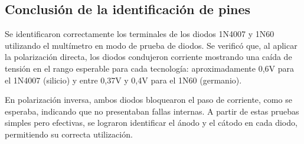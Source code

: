 \subsection{Conclusión de la identificación de pines}
\sangria{} Se identificaron correctamente los terminales de los diodos 1N4007 y 1N60 utilizando el multímetro en modo de prueba de diodos. Se verificó que, al aplicar la polarización directa, los diodos condujeron corriente mostrando una caída de tensión en el rango esperable para cada tecnología: aproximadamente 0,6V para el 1N4007 (silicio) y entre 0,37V y 0,4V para el 1N60 (germanio).

\sangria{} En polarización inversa, ambos diodos bloquearon el paso de corriente, como se esperaba, indicando que no presentaban fallas internas. A partir de estas pruebas simples pero efectivas, se lograron identificar el ánodo y el cátodo en cada diodo, permitiendo su correcta utilización.

